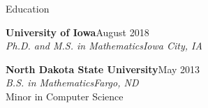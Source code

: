 \documentclass{resume} %
\begin{document}

\begin{rSection}{Education}

{\bf University of Iowa}\hfill August 2018\\
{\em Ph.D. and M.S. in Mathematics}\hfill {\em Iowa City, IA}%

{\bf North Dakota State University}\hfill May 2013\\
{\em B.S. in Mathematics}\hfill {\em Fargo, ND}\\
Minor in Computer Science


\end{rSection}









\end{document}
